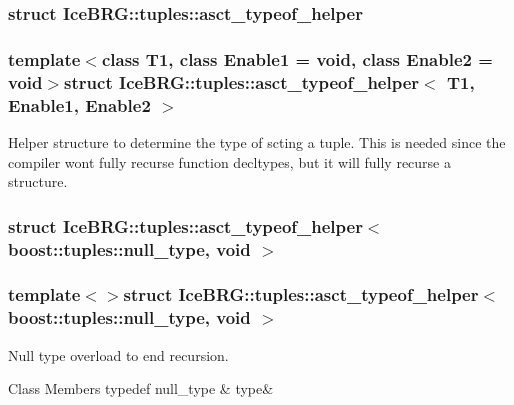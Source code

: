 \subsubsection{struct Ice\+B\+R\+G\+:\+:tuples\+:\+:asct\+\_\+typeof\+\_\+helper}
\subsubsection*{template$<$class T1, class Enable1 = void, class Enable2 = void$>$struct Ice\+B\+R\+G\+::tuples\+::asct\+\_\+typeof\+\_\+helper$<$ T1, Enable1, Enable2 $>$}

Helper structure to determine the type of scting a tuple. This is needed since the compiler won\textquotesingle{}t fully recurse function decltypes, but it will fully recurse a structure. \label{structIceBRG_1_1tuples_1_1asct__typeof__helper_3_01boost_1_1tuples_1_1null__type_00_01void_01_4}
\hypertarget{namespaceIceBRG_1_1tuples_structIceBRG_1_1tuples_1_1asct__typeof__helper_3_01boost_1_1tuples_1_1null__type_00_01void_01_4}{}
\subsubsection{struct Ice\+B\+R\+G\+:\+:tuples\+:\+:asct\+\_\+typeof\+\_\+helper$<$ boost\+:\+:tuples\+:\+:null\+\_\+type, void $>$}
\subsubsection*{template$<$$>$struct Ice\+B\+R\+G\+::tuples\+::asct\+\_\+typeof\+\_\+helper$<$ boost\+::tuples\+::null\+\_\+type, void $>$}

Null type overload to end recursion. \begin{DoxyFields}{Class Members}
\hypertarget{namespaceIceBRG_1_1tuples_a9a6e4f934d283ccdc51be79f48c96f08}{}typedef null\+\_\+type\label{namespaceIceBRG_1_1tuples_a9a6e4f934d283ccdc51be79f48c96f08}
&
type&
\\
\hline

\end{DoxyFields}
\label{structIceBRG_1_1tuples_1_1asct__typeof__helper_3_01T1_00_01BRG__S__IS__TUPLE_07T1_08_4}
\hypertarget{namespaceIceBRG_1_1tuples_structIceBRG_1_1tuples_1_1asct__typeof__helper_3_01T1_00_01BRG__S__IS__TUPLE_07T1_08_4}{}
